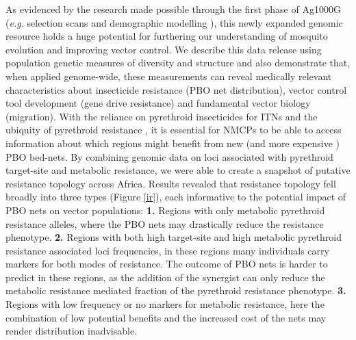 \documentclass[a4paper,11pt,abstracton,hidelinks]{scrartcl}
\begin{document}
As evidenced by the research made possible through the first phase of Ag1000G \cite{Ag1000gConsortium2017} (\textit{e.g.} selection scans \cite{xue2019} and demographic modelling \cite{khatri2018}), this newly expanded genomic resource holds a huge potential for furthering our understanding of mosquito evolution and improving vector control.
%
We describe this data release using population genetic measures of diversity and structure and also demonstrate that, when applied genome-wide, these measurements can reveal medically relevant characteristics about insecticide resistance (PBO net distribution), vector control tool development (gene drive resistance) and fundamental vector biology (migration).
%
With the reliance on pyrethroid insecticides for ITNs and the ubiquity of pyrethroid resistance \cite{Hemingway2016}, it is essential for NMCPs to be able to access information about which regions might benefit from new (and more expensive \cite{churcher2016}) PBO bed-nets.
% 
By combining genomic data on loci associated with pyrethroid target-site and metabolic resistance, we were able to create a snapshot of putative resistance topology across Africa.
%
Results revealed that resistance topology fell broadly into three types (Figure \ref{ir}), each informative to the potential impact of PBO nets on vector populations:
\textbf{1.} Regions with only metabolic pyrethroid resistance alleles, where the PBO nets may drastically reduce the resistance phenotype.
%
\textbf{2.} Regions with both high target-site and high metabolic pyrethroid resistance associated loci frequencies, in these regions many individuals carry markers for both modes of resistance.
The outcome of PBO nets is harder to predict in these regions, as the addition of the synergist can only reduce the metabolic resistance mediated fraction of the pyrethroid resistance phenotype.
%
\textbf{3.} Regions with low frequency or no markers for metabolic resistance, here the combination of low potential benefits and the increased cost of the nets may render distribution inadvisable.
\end{document}

